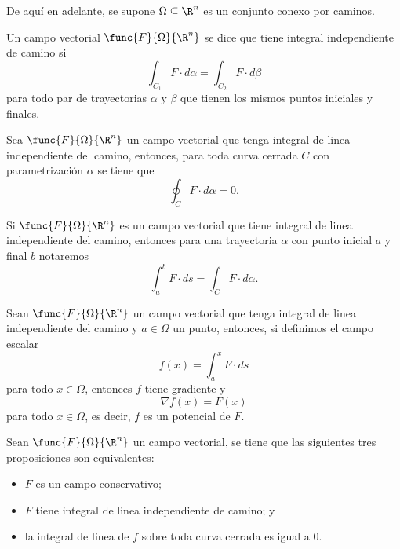 \documentclass[a4,11pt]{aleph-notas}
\begin{document}
De aquí en adelante, se supone $\Omega\subseteq \R^n$ es un conjunto conexo por caminos.

\begin{defi}
    Un campo vectorial $\func{F}{\Omega}{\R^n}$ se dice que tiene integral independiente de camino si
    \[
        \int_{C_1} F\cdot d\alpha = \int_{C_2} F\cdot d\beta
    \]
    para todo par de trayectorias $\alpha$ y $\beta$ que tienen los mismos puntos iniciales y finales.
\end{defi}



\begin{prop}
    Sea $\func{F}{\Omega}{\R^n}$ un campo vectorial que tenga integral de linea independiente del camino, entonces, para toda curva cerrada $C$ con parametrización $\alpha$ se tiene que
    \[
        \oint_C F\cdot d\alpha = 0.
    \]
\end{prop}


\begin{advertencia}
    Si $\func{F}{\Omega}{\R^n}$ es un campo vectorial que tiene integral de linea independiente del camino, entonces para una trayectoria $\alpha$ con punto inicial $a$ y final $b$ notaremos
    \[
        \int_a^b F\cdot ds = \int_C F\cdot d\alpha.
    \]    
\end{advertencia}


\begin{teo}
    Sean $\func{F}{\Omega}{\R^n}$ un campo vectorial que tenga integral de linea independiente del camino y $a\in \Omega$ un punto, entonces, si definimos el campo escalar
    \[
        f(x) = \int_a^x F\cdot ds
    \]
    para todo $x\in \Omega$, entonces $f$ tiene gradiente y
    \[
        \nabla f(x) = F(x)
    \]
    para todo $x\in \Omega$, es decir, $f$ es un potencial de $F$.
\end{teo}

\begin{prop}
    Sean $\func{F}{\Omega}{\R^n}$ un campo vectorial, se tiene que las siguientes tres proposiciones son equivalentes:
    \begin{itemize}
        \item $F$ es un campo conservativo;
        \item $F$ tiene integral de linea independiente de camino; y
        \item la integral de linea de $f$ sobre toda curva cerrada es igual a 0.
    \end{itemize}
\end{prop}
\end{document}
